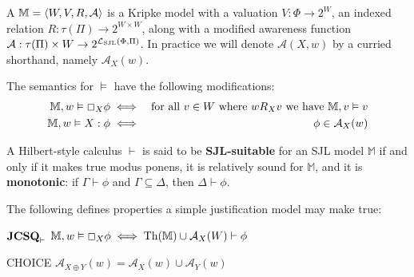 \begin{definition}
  \label{justmodels}A {} $\mathbbm{M}=
  \langle W, V, R, \mathcal{A} \rangle$ is a Kripke model with a valuation $V
  : \Phi  \rightarrow 2^W$, an indexed relation $R : \tau (\Pi) \rightarrow
  2^{W \times W}$, along with a modified awareness function
  $\mathcal{A} : \tau (\Pi) \times W
   \rightarrow 2^{\mathcal{L}_{\tmop{SJL}} (\Phi, \Pi)}$. 
  In practice we will denote $\mathcal{A} (X, w)$ by a curried shorthand, namely $\mathcal{A}_X (w)$.
  
  The semantics for $\vDash$ have the following modifications:
  \begin{eqnarray*}
    \mathbbm{M}, w \vDash \Box_X \phi & \iff & \text{for all $v \in W$
    where $w R_X v$ we have $\mathbbm{M}, v \vDash v$}\\
    \mathbbm{M}, w \vDash X : \phi & \iff & \phi \in \mathcal{A}_X (w)
  \end{eqnarray*}
\end{definition}

\begin{definition}
A Hilbert-style calculus $\vdash$ is said to be \textbf{SJL-suitable} for an SJL model
$\mathbb{M}$ if and only if it makes true modus ponens, it is
relatively sound for $\mathbb{M}$, and it is \textbf{monotonic}: if
$\Gamma \vdash \phi$ and $\Gamma \subseteq \Delta$, then $\Delta
\vdash \phi$.
\end{definition}

\begin{definition}
  The following defines properties a simple justification model may make true:
  
  \begin{descriptiondash}
    \item[$\textup{\textbf{JCSQ}}_\vdash$] $\mathbbm{M}, w \vDash \Box_X \phi \iff \tmop{Th}
    (\mathbbm{M}) \cup \mathcal{A}_X (W) \vdash \phi$
    \item[CHOICE] $\mathcal{A}_{X \oplus Y}(w) = \mathcal{A}_X (w) \cup
    \mathcal{A}_Y (w)$
  \end{descriptiondash}
\end{definition}


